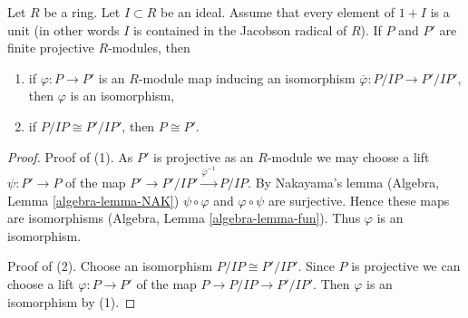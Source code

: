 \begin{lemma}
\label{lemma-isomorphic-finite-projective-lifts}
Let $R$ be a ring. Let $I \subset R$ be an ideal. Assume that
every element of $1 + I$ is a unit (in other words $I$ is contained
in the Jacobson radical of $R$). If $P$ and $P'$ are finite
projective $R$-modules, then
\begin{enumerate}
\item if $\varphi : P \to P'$ is an $R$-module map inducing an
isomorphism $\overline{\varphi} : P/IP \to P'/IP'$, then $\varphi$
is an isomorphism,
\item if $P/IP \cong P'/IP'$, then $P \cong P'$.
\end{enumerate}
\end{lemma}

\begin{proof}
Proof of (1). As $P'$ is projective as an $R$-module we may
choose a lift $\psi : P' \to P$ of the map
$P' \to P'/IP' \xrightarrow{\overline{\varphi}^{-1}} P/IP$.
By Nakayama's lemma (Algebra, Lemma \ref{algebra-lemma-NAK})
$\psi \circ \varphi$ and $\varphi \circ \psi$ are surjective.
Hence these maps are isomorphisms (Algebra, Lemma \ref{algebra-lemma-fun}).
Thus $\varphi$ is an isomorphism.

\medskip\noindent
Proof of (2). Choose an isomorphism $P/IP \cong P'/IP'$.
Since $P$ is projective we can choose a lift $\varphi : P \to P'$ of the map
$P \to P/IP \to P'/IP'$. Then $\varphi$ is an isomorphism by (1).
\end{proof}
